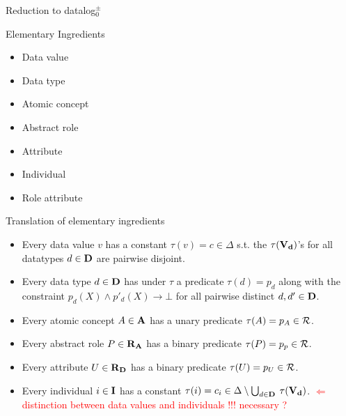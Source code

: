 \documentclass{beamer}
\def\R{\hbox{${\cal{R}}$}}
\begin{document}
 
 
 
 \begin{frame}{Reduction to datalog$^\pm_0$}
 
 \begin{block}{Elementary Ingredients}
 \begin{itemize}
 \item Data value
 \item Data type
 \item Atomic concept
 \item Abstract role
 \item Attribute
 \item Individual
 \item Role attribute
 \end{itemize}
 
 \end{block}
 
 \end{frame}
 
 
 \begin{frame}{Translation of elementary ingredients}
 
 \small
 \begin{itemize}
 \item Every data value $v$ has a constant $\tau (v) = c \in \Delta$ s.t.  the $\tau (\bf{V}_d)$'s  for all datatypes $d \in \bf{D}$ are pairwise disjoint.
 \item  Every data type $d \in \bf{D}$ has under $\tau$  a predicate $\tau (d) = p_d$ along with the constraint $p_d(X) \wedge p'_d(X) \rightarrow \bot$
 for all pairwise  distinct $d, d' \in \bf{D}$.
 \item Every atomic concept $A \in \bf{A}$ has a unary predicate $\tau (A) = p_A \in \R$.
 \item Every abstract role $P \in \bf{R}_A$ has a binary predicate $\tau (P) = p_p \in \R$.
 \item Every attribute   $U \in \bf{R}_D$ has a binary predicate $\tau (U) = p_U \in \R$.
 \item Every individual $i \in \bf{I}$ has a constant $\tau (i) = c_i \in \Delta \setminus \bigcup_{d \in \bf{D}}$ $\tau (\bf{V}_d)$.  
 \textcolor{red}{$\Longleftarrow$ distinction  between data values and individuals !!! necessary ?}
 \end{itemize}
 \end{frame}
 
\end{document}
